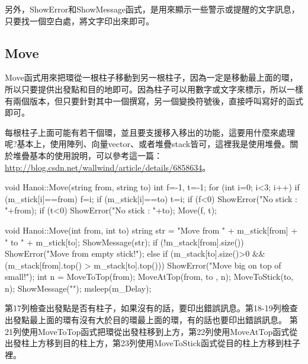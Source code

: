 \documentclass[12pt,a4paper]{article}
\begin{document}
另外，ShowError和ShowMessage函式，是用來顯示一些警示或提醒的文字訊息，只要找一個空白處，將文字印出來即可。

\subsection{Move}
Move函式用來把環從一根柱子移動到另一根柱子，因為一定是移動最上面的環，所以只要提供出發點和目的地即可。因為柱子可以用數字或文字來標示，所以一樣有兩個版本，但只要針對其中一個撰寫，另一個變換符號後，直接呼叫寫好的函式即可。

每根柱子上面可能有若干個環，並且要支援移入移出的功能，這要用什麼來處理呢?基本上，使用陣列、向量vector、或者堆疊stack皆可，這裡我是使用堆疊。關於堆疊基本的使用說明，可以參考這一篇：
\url{http://blog.csdn.net/wallwind/article/details/6858634}。
\begin{cppcode}
	void Hanoi::Move(string from, string to)
	{
		int f=-1, t=-1;
		for (int i=0; i<3; i++) {
			if (m_stick[i]==from) f=i;
			if (m_stick[i]==to) t=i;
		}
		if (f<0) ShowError("No stick : "+from);
		if (t<0) ShowError("No stick : "+to);
		Move(f, t);
	}
	
	void Hanoi::Move(int from, int to)
	{
		string str = "Move from " + m_stick[from] + " to " + m_stick[to];
		ShowMessage(str);
		if (!m_stack[from].size()) ShowError("Move from empty stick!");
		else if (m_stack[to].size()>0 && 
			(m_stack[from].top() > m_stack[to].top()))
				ShowError("Move big on top of small!");
		int n = MoveToTop(from);
		MoveAtTop(from, to , n);
		MoveToStick(to, n);
		ShowMessage("");
		msleep(m_Delay);
	}
\end{cppcode}
第17列檢查出發點是否有柱子，如果沒有的話，要印出錯誤訊息。第18-19列檢查出發點最上面的環有沒有大於目的環最上面的環，有的話也要印出錯誤訊息。
第21列使用MoveToTop函式把環從出發柱移到上方，第22列使用MoveAtTop函式從出發柱上方移到目的柱上方，第23列使用MoveToStick函式從目的柱上方移到柱子裡。
\end{document}
